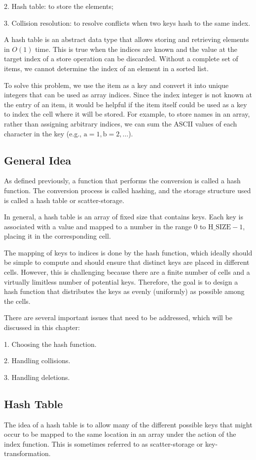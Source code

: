 2. Hash table: to store the elements; 

3. Collision resolution: to resolve conflicts when two keys hash to the same index. 

A hash table is an abstract data type that allows storing and retrieving elements in \(O(1)\) time. This is true when the indices are known and the value at the target index of a store operation can be discarded. Without a complete set of items, we cannot determine the index of an element in a sorted list.

To solve this problem, we use the item as a key and convert it into unique integers that can be used as array indices. Since the index integer is not known at the entry of an item, it would be helpful if the item itself could be used as a key to index the cell where it will be stored. For example, to store names in an array, rather than assigning arbitrary indices, we can sum the ASCII values of each character in the key (e.g., \(\text{a} = 1, \text{b} = 2, \dots\)).

\subsection{General Idea}
As defined previously, a function that performs the conversion is called a hash function. The conversion process is called hashing, and the storage structure used is called a hash table or scatter-storage.

In general, a hash table is an array of fixed size that contains keys. Each key is associated with a value and mapped to a number in the range \(0\) to \(\text{H\_SIZE} - 1\), placing it in the corresponding cell.

The mapping of keys to indices is done by the hash function, which ideally should be simple to compute and should ensure that distinct keys are placed in different cells. However, this is challenging because there are a finite number of cells and a virtually limitless number of potential keys. Therefore, the goal is to design a hash function that distributes the keys as evenly (uniformly) as possible among the cells.

There are several important issues that need to be addressed, which will be discussed in this chapter:

1. Choosing the hash function.

2. Handling collisions.

3. Handling deletions.

\subsection{Hash Table}
The idea of a hash table is to allow many of the different possible keys that might occur to be mapped to the same location in an array under the action of the index function. This is sometimes referred to as scatter-storage or key-transformation.

